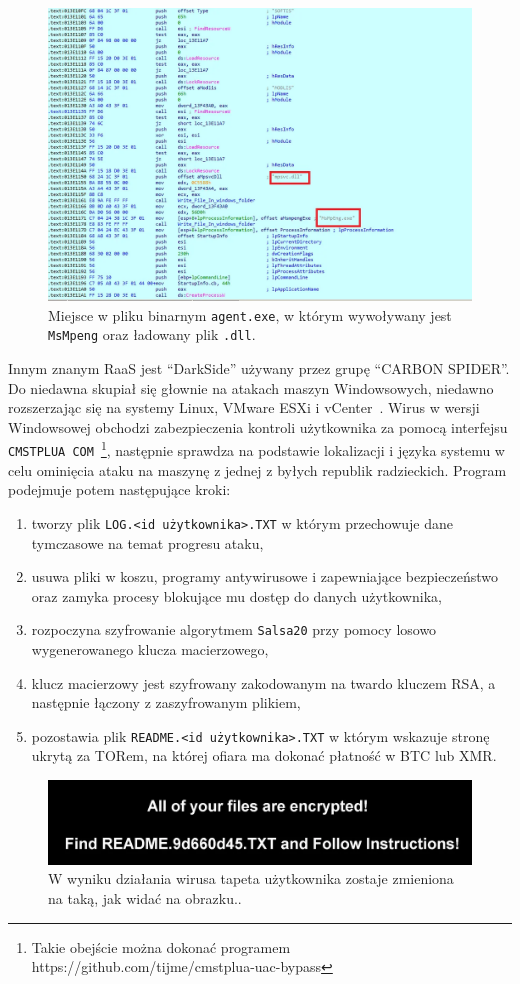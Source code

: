 \begin{figure}[H]
    \centering
    \includegraphics[width=0.8\linewidth]{rysunki/obnjdumpagenta.png}
    \caption{Miejsce w pliku binarnym \texttt{agent.exe}, w którym wywoływany jest \texttt{MsMpeng} oraz ładowany plik \texttt{.dll}. }
    \label{fig:enter-label}
\end{figure}
Innym znanym RaaS jest \foreignquote{english}{DarkSide} używany przez grupę \foreignquote{english}{CARBON SPIDER}. Do niedawna skupiał się głownie na atakach maszyn Windowsowych, niedawno rozszerzając się na systemy Linux, VMware ESXi i vCenter~\cite{darkside}. Wirus w wersji Windowsowej obchodzi zabezpieczenia kontroli użytkownika za pomocą interfejsu \texttt{CMSTPLUA COM}~\footnote{Takie obejście można dokonać programem https://github.com/tijme/cmstplua-uac-bypass}, następnie sprawdza na podstawie lokalizacji i języka systemu w celu ominięcia ataku na maszynę z jednej z byłych republik radzieckich. Program podejmuje potem następujące kroki:
\begin{enumerate}
    \item tworzy plik \texttt{LOG.<id użytkownika>.TXT} w którym przechowuje dane tymczasowe na temat progresu ataku,
    \item usuwa pliki w koszu, programy antywirusowe i zapewniające bezpieczeństwo oraz zamyka procesy blokujące mu dostęp do danych użytkownika,
    \item rozpoczyna szyfrowanie algorytmem \texttt{Salsa20} przy pomocy losowo wygenerowanego klucza macierzowego,
    \item klucz macierzowy jest szyfrowany zakodowanym na twardo kluczem RSA, a następnie łączony z zaszyfrowanym plikiem,
    \item pozostawia plik \texttt{README.<id użytkownika>.TXT} w którym wskazuje stronę ukrytą za TORem, na której ofiara ma dokonać płatność w BTC lub XMR.
\end{enumerate}
\begin{figure}[H]
    \centering
    \includegraphics[width=0.75\linewidth]{rysunki/tapeta.png}
    \caption{W wyniku działania wirusa tapeta użytkownika zostaje zmieniona na taką, jak widać na obrazku..}
    \label{fig:enter-label}
\end{figure}
